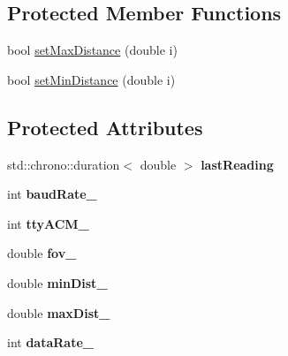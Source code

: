 \subsection*{Protected Member Functions}
\begin{DoxyCompactItemize}
\item 
bool \hyperlink{classRanger_ac191d948d1a1451927f0a856f131fed0}{set\+Max\+Distance} (double i)
\item 
bool \hyperlink{classRanger_ac3c89ae3ce2b6529f385ac356ca899f6}{set\+Min\+Distance} (double i)
\end{DoxyCompactItemize}
\subsection*{Protected Attributes}
\begin{DoxyCompactItemize}
\item 
std\+::chrono\+::duration$<$ double $>$ {\bfseries last\+Reading}\hypertarget{classRanger_a1bdab7210a1469ffff99eedd28f8b7e6}{}\label{classRanger_a1bdab7210a1469ffff99eedd28f8b7e6}

\item 
int {\bfseries baud\+Rate\+\_\+}\hypertarget{classRanger_aced6f17f9f3e14fb3a74d041d239d021}{}\label{classRanger_aced6f17f9f3e14fb3a74d041d239d021}

\item 
int {\bfseries tty\+A\+C\+M\+\_\+}\hypertarget{classRanger_affe5d5e2bcd736aa64fe36e8c305ebb6}{}\label{classRanger_affe5d5e2bcd736aa64fe36e8c305ebb6}

\item 
double {\bfseries fov\+\_\+}\hypertarget{classRanger_a43cc24e0ee22c92224eb6279f5da18d1}{}\label{classRanger_a43cc24e0ee22c92224eb6279f5da18d1}

\item 
double {\bfseries min\+Dist\+\_\+}\hypertarget{classRanger_a162f6de8033276f58138b46d39b78361}{}\label{classRanger_a162f6de8033276f58138b46d39b78361}

\item 
double {\bfseries max\+Dist\+\_\+}\hypertarget{classRanger_a46504fe73b39234252b9f93d9a6423a7}{}\label{classRanger_a46504fe73b39234252b9f93d9a6423a7}

\item 
int {\bfseries data\+Rate\+\_\+}\hypertarget{classRanger_a0e489954008a72da7eb57884b6ba5a73}{}\label{classRanger_a0e489954008a72da7eb57884b6ba5a73}

\end{DoxyCompactItemize}


